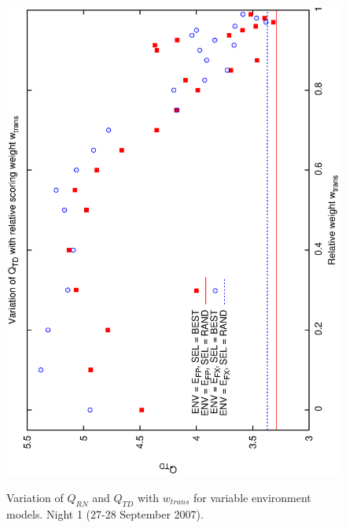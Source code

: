 \begin{figure}[h]
\begin{center}
{    \includegraphics[scale=0.5, angle=-90]{figures/cs1_dw1a2_td.eps}
    \label{fig:cs1_dw1a2_td}
  }
 \caption{Variation of $Q_{RN}$ and $Q_{TD}$ with $w_{trans}$  for variable environment models.  Night 1 (27-28 September 2007).}
\end{center}
\end{figure}

